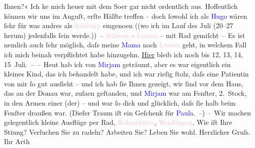                Ihnen?«\pend
           \pstart
           Ich ke{\geminationn} mich heuer mit dem So{\geminationm}er gar nicht ordentlich aus. Hoffentlich können wir uns
               im Auguſt, erſte Hälfte treffen – doch ſowohl \introOben{}ich\introOben{} als \textcolor{blue}{Hugo}{}\ledrightnote{\textcolor{blue}{Hugo von Hofmannsthal}} wären ſehr für was {\pb}andres als \textcolor{pink}{Salzburg}{}\ledrightnote{\textcolor{pink}{Salzburg}}
                  eingeno{\geminationm}en \introOben{}(\introOben{}(wo ich im Lauf
               des Juli (20–27 herum) jedenfalls ſein
               werde.)) – \textcolor{pink}{Schweiz}{}\ledrightnote{\textcolor{pink}{Schweiz}} – \textcolor{pink}{Luzern}{}\ledrightnote{\textcolor{pink}{Luzern}} – mit Rad gemiſcht –\pend
           \pstart
           Es ist nemlich auch ſehr möglich, daſs meine \textcolor{blue}{Mama}{} nach \textcolor{pink}{Luzern}{}\ledrightnote{\textcolor{pink}{Luzern}} geht, in
               welchem Fall ich mich beinah verpflichtet habe hinzugehn. \uline{Hier} bleib ich noch bis 12, 13, 14, 15 Juli. –\pend
           \pstart
           – Heut hab ich von \textcolor{blue}{Mirjam}{}\ledrightnote{\textcolor{blue}{Mirjam Beer-Hofmann}} geträumt, aber es war
               eigentlich ein kleines Kind, das ich behandelt habe, und ich {\pb}war rieſig ſtolz, daſs eine Patientin von mir ſo gut
               ausſieht – und ich hab ſie Ihnen gezeigt, wir ſind vor dem Haus, das an der Donau war, zuſa{\geminationm}en geſtanden,
               und \textcolor{blue}{Mirjam}{}\ledrightnote{\textcolor{blue}{Mirjam Beer-Hofmann}} war am Fenſter, 2. Stock, in den Armen
               einer \textcolor{blue}{\label{K_L00809_1v}\label{K_L00809_1h}}{} (\introOben{}der\introOben{}{ }\label{K_L00809_2v}\label{K_L00809_2h}) – und war ſo dick und glücklich, daſs ſie halb beim Fenſter draußen
               war. (Dieſer Traum iſt ein Geſchenk für \textcolor{blue}{Paula}{}\ledrightnote{\textcolor{blue}{Paula Beer-Hofmann}}. –)\pend
           \pstart
           – Wir machen gelegentlich kleine Aus{\pb}flüge per Rad,
                  \textcolor{pink}{Rohrerhütte}{}\ledrightnote{\textcolor{pink}{Rohrerhütte}}, \textcolor{pink}{Weidlingau}{}\ledrightnote{\textcolor{pink}{Weidlingau}}.\pend
           \pstart
           Wie iſt Ihre Sti{\geminationm}ung? Verſuchen Sie zu radeln? Arbeiten
               Sie?\pend
           \pstart
           Leben Sie wohl. Herzlicher Gruſs. Ihr \spacefill\mbox{Arth}\pend
           \endnumbering{}  
      